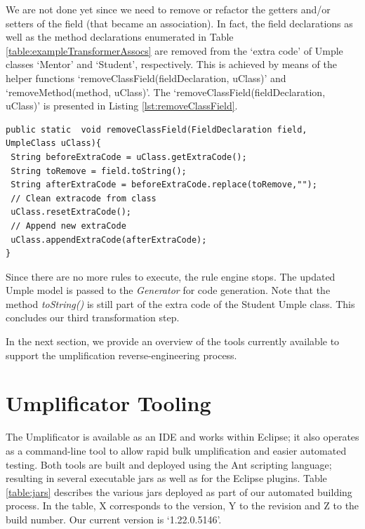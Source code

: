 We are not done yet since we need to remove or refactor the getters  and/or setters of the field (that became an association). In fact, the field declarations as well as the method declarations enumerated in Table \ref{table:exampleTransformerAssocs} are removed from the `extra code' of Umple classes `Mentor' and `Student', respectively. This is achieved by means of the helper functions `removeClassField(fieldDeclaration, uClass)' and `removeMethod(method, uClass)'. The `removeClassField(fieldDeclaration, uClass)' is presented in Listing \ref{lst:removeClassField}.

\begin{lstlisting}[style=java, label={lst:removeClassField}, caption=Function removeClassField]
public static  void removeClassField(FieldDeclaration field, UmpleClass uClass){
 String beforeExtraCode = uClass.getExtraCode();
 String toRemove = field.toString();
 String afterExtraCode = beforeExtraCode.replace(toRemove,"");
 // Clean extracode from class
 uClass.resetExtraCode();
 // Append new extraCode
 uClass.appendExtraCode(afterExtraCode);
}
\end{lstlisting}

Since there are no more rules to execute, the rule engine stops. The updated Umple model is passed to the \textit{Generator} for code generation. Note that the method \textit{toString()} is still part of the extra code of the Student Umple class. This concludes our third transformation step.

In the next section, we provide an overview of the tools currently available to support the umplification reverse-engineering process.

\section{Umplificator Tooling}

The Umplificator is available as an IDE and works within Eclipse; it also operates as a command-line tool to allow rapid bulk umplification and easier automated testing. Both tools are built and deployed using the Ant scripting language; resulting in several executable jars as well as for the Eclipse plugins. Table \ref{table:jars} describes the various jars deployed as part of our automated building process. In the table, X corresponds to the version, Y to the revision and Z to the build number. Our current version is `1.22.0.5146'.

